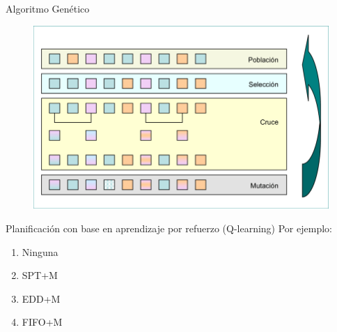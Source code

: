 \documentclass{beamer}
\begin{document}
\begin{frame}{Algoritmo Genético \citep{batista2009}}
	\begin{figure}
		\centering
		\includegraphics[scale = 0.35]{algoritmogenetico}
	\end{figure}
	
\end{frame}

\begin{frame}{Planificación con base en aprendizaje por refuerzo (Q-learning)}
Por ejemplo:
\setlength{\leftmargini}{60 pt}
\begin{enumerate}
	\item Ninguna
	\item SPT+M
	\item EDD+M
	\item FIFO+M
\end{enumerate}	
\end{frame}
\end{document}
